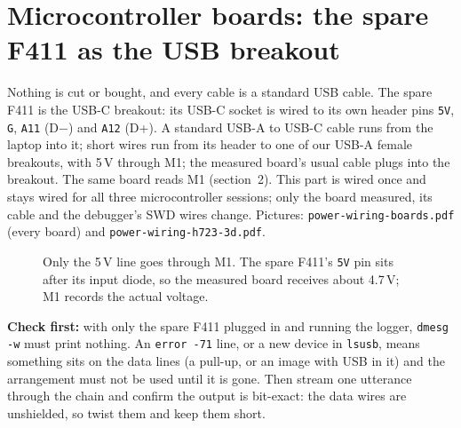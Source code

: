 \documentclass[11pt]{article}
\newcommand{\code}[1]{\texttt{#1}}
\begin{document}
\section{\texorpdfstring{Microcontroller boards: the spare F411 as the USB breakout}{Microcontroller boards: the spare F411 as the USB breakout}}

Nothing is cut or bought, and every cable is a standard USB cable. The spare F411 is the
USB-C breakout: its USB-C socket is wired to its own header pins \code{5V}, \code{G},
\code{A11} (D$-$) and \code{A12} (D+). A standard USB-A to USB-C cable runs from the laptop into
it; short wires run from its header to one of our USB-A female breakouts, with 5\,V through M1;
the measured board's usual cable plugs into the breakout. The same board reads M1 (section~2).
This part is wired once and stays wired for all three microcontroller sessions; only the board
measured, its cable and the debugger's SWD wires change. Pictures:
\code{power-wiring-boards.pdf} (every board) and \code{power-wiring-h723-3d.pdf}.

\begin{figure}[h]
\centering
{}
\caption{Only the 5\,V line goes through M1. The spare F411's \code{5V} pin sits after its input
diode, so the measured board receives about 4.7\,V; M1 records the actual voltage.}
\end{figure}

\textbf{Check first:} with only the spare F411 plugged in and running the logger, \code{dmesg -w}
must print nothing. An \code{error -71} line, or a new device in \code{lsusb}, means something
sits on the data lines (a pull-up, or an image with USB in it) and the arrangement must not be
used until it is gone. Then stream one utterance through the chain and confirm the output is
bit-exact: the data wires are unshielded, so twist them and keep them short.
\end{document}
